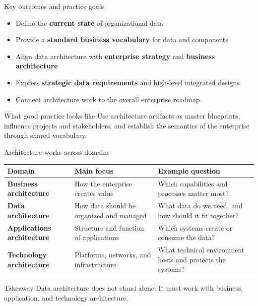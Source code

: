 \documentclass[aspectratio=169,professionalfonts]{beamer}
\newcommand{\sourcefooter}{\vspace{0.4em}{\tiny Source: DAMA-DMBOK2, Chapter 4 (Data Architecture).}}
\begin{document}
\begin{frame}{Key outcomes and practice goals}
\begin{itemize}
    \item Define the \textbf{current state} of organizational data
    \item Provide a \textbf{standard business vocabulary} for data and components
    \item Align data architecture with \textbf{enterprise strategy} and \textbf{business architecture}
    \item Express \textbf{strategic data requirements} and high-level integrated designs
    \item Connect architecture work to the overall enterprise roadmap
\end{itemize}
\begin{block}{What good practice looks like}
Use architecture artifacts as master blueprints, influence projects and stakeholders, and establish the semantics of the enterprise through shared vocabulary.
\end{block}
\sourcefooter
\end{frame}

\begin{frame}{Architecture works across domains}
\small
\begin{tabularx}{\textwidth}{>{\bfseries}p{2.5cm}X X}
\toprule
Domain & Main focus & Example question \\
\midrule
Business architecture & How the enterprise creates value & Which capabilities and processes matter most? \\
Data architecture & How data should be organized and managed & What data do we need, and how should it fit together? \\
Applications architecture & Structure and function of applications & Which systems create or consume the data? \\
Technology architecture & Platforms, networks, and infrastructure & What technical environment hosts and protects the systems? \\
\bottomrule
\end{tabularx}

\vspace{0.6em}
\begin{block}{Takeaway}
Data architecture does not stand alone. It must work with business, application, and technology architecture.
\end{block}
\sourcefooter
\end{frame}
\end{document}
